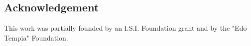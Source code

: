 \documentclass{bioinfo}
\begin{document}
\begin{application}
\section*{Acknowledgement}
This work was partially founded by an I.S.I. Foundation grant and by the "Edo Tempia" Foundation.


%
%
%
%
%






\end{application}
\end{document}
